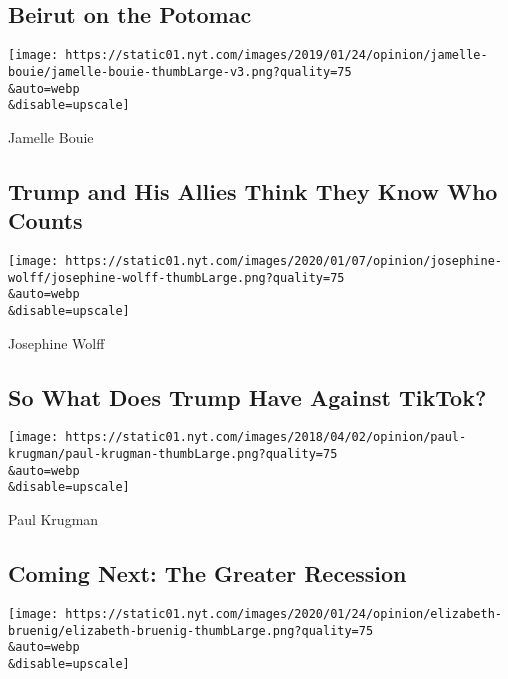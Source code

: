 \hypertarget{beirut-on-the-potomac}{%
\subsection{Beirut on the Potomac}\label{beirut-on-the-potomac}}

\href{/2020/08/07/opinion/trump-2020-census.html}{}

\texttt{[image: https://static01.nyt.com/images/2019/01/24/opinion/jamelle-bouie/jamelle-bouie-thumbLarge-v3.png?quality=75\\\&auto=webp\\\&disable=upscale]}

Jamelle Bouie

\hypertarget{trump-and-his-allies-think-they-know-who-counts}{%
\subsection{Trump and His Allies Think They Know Who
Counts}\label{trump-and-his-allies-think-they-know-who-counts}}

\href{/2020/08/07/opinion/tiktok-wechat-china-trump-executive-order.html}{}

\texttt{[image: https://static01.nyt.com/images/2020/01/07/opinion/josephine-wolff/josephine-wolff-thumbLarge.png?quality=75\\\&auto=webp\\\&disable=upscale]}

Josephine Wolff

\hypertarget{so-what-does-trump-have-against-tiktok}{%
\subsection{So What Does Trump Have Against
TikTok?}\label{so-what-does-trump-have-against-tiktok}}

\href{/2020/08/06/opinion/coronavirus-us-recession.html}{}

\texttt{[image: https://static01.nyt.com/images/2018/04/02/opinion/paul-krugman/paul-krugman-thumbLarge.png?quality=75\\\&auto=webp\\\&disable=upscale]}

Paul Krugman

\hypertarget{coming-next-the-greater-recession}{%
\subsection{Coming Next: The Greater
Recession}\label{coming-next-the-greater-recession}}

\href{/2020/08/06/opinion/sunday/gloria-purvis-george-floyd-blm.html}{}

\texttt{[image: https://static01.nyt.com/images/2020/01/24/opinion/elizabeth-bruenig/elizabeth-bruenig-thumbLarge.png?quality=75\\\&auto=webp\\\&disable=upscale]}

